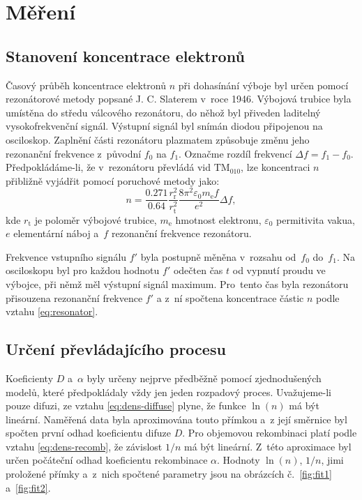 \documentclass{protokol}
\newcommand\emass{m_\mathrm{e}}
\newcommand\elemcharge{e}
\newcommand\permitvac{\varepsilon_0}
\newcommand\tm{t}
\newcommand\freq{f}
\newcommand\freqbase{\freq_0}
\newcommand\freqplas{\freq_1}
\newcommand\freqsig{\freq'}
\newcommand\deltafreq{\Delta\freq}
\newcommand\dens{n}
\newcommand\diffuse{D}
\newcommand\recomb{\alpha}
\newcommand\tuberadius{r_\mathrm{t}}
\newcommand\resradius{r_\mathrm{r}}
\begin{document}
\section{Měření}

\subsection{Stanovení koncentrace elektronů}
Časový průběh koncentrace elektronů $\dens$ při dohasínání výboje
byl určen pomocí rezonátorové metody popsané J. C. Slaterem v~roce 1946.
Výbojová trubice byla umístěna do středu válcového rezonátoru,
do něhož byl přiveden laditelný vysokofrekvenční signál.
Výstupní signál byl snímán diodou připojenou na osciloskop.
Zaplnění části rezonátoru plazmatem způsobuje změnu jeho rezonanční
frekvence z~původní $\freqbase$ na $\freqplas$.
Označme rozdíl frekvencí $\deltafreq = \freqplas - \freqbase$.
Předpokládáme-li, že v~rezonátoru převládá vid $\mathrm{TM}_{010}$,
lze koncentraci $\dens$ přibližně vyjádřit pomocí poruchové metody jako:
\begin{equation}
	\label{eq:resonator}
	\dens=\frac{\num{0.271}}{\num{0.64}} \frac{\resradius^2}{\tuberadius^2}
		\frac{8\pi^2 \permitvac\emass\freq}{\elemcharge^2} \deltafreq,
\end{equation}
kde $\tuberadius$ je poloměr výbojové trubice, $\emass$ hmotnost elektronu,
$\permitvac$ permitivita vakua, $\elemcharge$ elementární náboj
a~$\freq$ rezonanční frekvence rezonátoru.

Frekvence vstupního signálu $\freqsig$ byla postupně měněna v~rozsahu
od~$\freqbase$ do~$\freqplas$.
Na osciloskopu byl pro každou hodnotu $\freqsig$ odečten čas $\tm$ od vypnutí
proudu ve výbojce, při němž měl výstupní signál maximum.
Pro~tento čas byla rezonátoru přisouzena rezonanční frekvence $\freqsig$
a z~ní spočtena koncentrace částic $\dens$ podle vztahu \eqref{eq:resonator}.

% 	

\subsection{Určení převládajícího procesu}
Koeficienty $\diffuse$ a~$\recomb$ byly určeny nejprve předběžně pomocí
zjednodušených modelů, které předpokládaly vždy jen jeden rozpadový proces.
Uvažujeme-li pouze difuzi, ze vztahu \eqref{eq:dens-diffuse} plyne,
že funkce $\ln(\dens)$ má být lineární.
Naměřená data byla aproximována touto přímkou a~z její směrnice
byl spočten první odhad koeficientu difuze $\diffuse$.
Pro objemovou rekombinaci platí podle vztahu \eqref{eq:dens-recomb},
že závislost $1/\dens$ má být lineární.
Z~této aproximace byl určen počáteční odhad koeficientu rekombinace $\recomb$.
Hodnoty $\ln(\dens)$, $1/\dens$, jimi proložené přímky a~z~nich spočtené
parametry jsou na obrázcích č.~\ref{fig:fit1} a~\ref{fig:fit2}.
\end{document}

